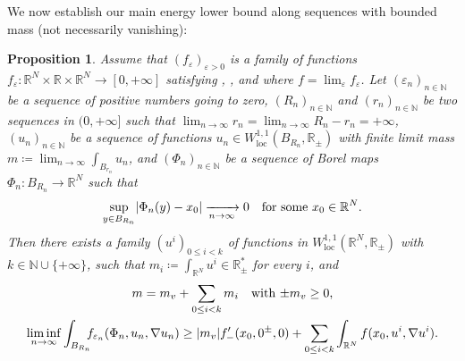 \documentclass[10pt]{amsart}
\theoremstyle{plain}
\newtheorem{proposition}[theorem]{Proposition}
\theoremstyle{definition}
\newcommand{\N}{\mathbb{N}}
\newcommand{\R}{\mathbb{R}}
\newcommand{\loc}{\mathrm{loc}}
\newcommand{\eps}{\varepsilon}
\DeclarePairedDelimiter{\abs}{\lvert}{\rvert}
\newcommand{\xto}[2][]{\xrightarrow[#2]{#1}}
\begin{document}
We now establish our main energy lower bound along sequences with bounded mass (not necessarily vanishing):
\begin{proposition}\label{almostMinimisers}
Assume that $(f_\eps)_{\eps > 0}$ is a family of functions \(f_\eps:\R^N\times\R\times\R^N\to[0,+\infty]\) satisfying , ,  and  where \(f = \lim_\eps f_\eps\). Let \((\eps_n)_{n\in\N}\) be a sequence of positive numbers going to zero, \((R_n)_{n\in\N}\) and \((r_n)_{n\in\N}\) be two sequences in \((0,+\infty]\) such that \(\lim_{n\to\infty}r_n=\lim_{n\to\infty} R_n-r_n= +\infty\), \((u_n)_{n\in\N}\) be a sequence of functions \(u_n \in W^{1,1}_\loc(B_{R_n},\R_\pm)\) with finite limit mass $m \coloneqq \lim_{n\to\infty} \int_{B_{r_n}} u_n$, and $(\Phi_n)_{n\in\N}$ be a sequence of Borel maps \(\Phi_n:B_{R_n}\to\R^N\) such that
\begin{equation}
\label{hypPhiN}
\sup_{y\in B_{R_n}}\abs{\Phi_n(y)-x_0} \xto{n\to\infty} 0\quad \text{for some \(x_0\in\R^N\).}
\end{equation}
Then there exists a family \((u^i)_{0\leq i<k}\) of functions in \(W^{1,1}_\loc(\R^N,\R_\pm)\) with \(k\in\N\cup\{+\infty\}\), such that \(m_i\coloneqq\int_{\R^N}u^i\in\R_\pm^\ast\) for every \(i\), and
\begin{gather}\label{MassVanishingFormula}
m=m_v+\sum_{0\leq i<k}m_i\quad\text{with \(\pm m_v\geq 0\),}\\
\label{decompositionSequences}
\liminf_{n\to\infty}\int_{B_{R_n}}\hspace*{-2mm}f_{\eps_n}(\Phi_n,u_n,\nabla u_n) \geq \abs{m_v} f'_-(x_0,0^\pm,0)+\sum_{0\leq i<k}\int_{\R^N}f(x_0,u^i,\nabla u^i).
\end{gather}
\end{proposition}
\end{document}
